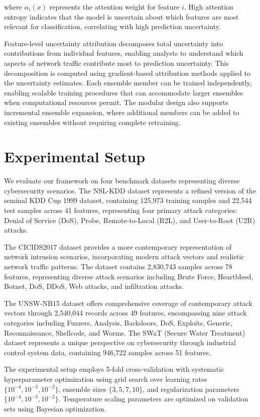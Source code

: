 \documentclass[journal]{IEEEtran}
\begin{document}
where $\alpha_i(x)$ represents the attention weight for feature $i$. High attention entropy indicates that the model is uncertain about which features are most relevant for classification, correlating with high prediction uncertainty.

Feature-level uncertainty attribution decomposes total uncertainty into contributions from individual features, enabling analysts to understand which aspects of network traffic contribute most to prediction uncertainty. This decomposition is computed using gradient-based attribution methods applied to the uncertainty estimates. Each ensemble member can be trained independently, enabling scalable training procedures that can accommodate larger ensembles when computational resources permit. The modular design also supports incremental ensemble expansion, where additional members can be added to existing ensembles without requiring complete retraining.

\section{Experimental Setup}

We evaluate our framework on four benchmark datasets representing diverse cybersecurity scenarios. The NSL-KDD dataset represents a refined version of the seminal KDD Cup 1999 dataset, containing 125,973 training samples and 22,544 test samples across 41 features, representing four primary attack categories: Denial of Service (DoS), Probe, Remote-to-Local (R2L), and User-to-Root (U2R) attacks.

The CICIDS2017 dataset provides a more contemporary representation of network intrusion scenarios, incorporating modern attack vectors and realistic network traffic patterns. The dataset contains 2,830,743 samples across 78 features, representing diverse attack scenarios including Brute Force, Heartbleed, Botnet, DoS, DDoS, Web attacks, and infiltration attacks.

The UNSW-NB15 dataset offers comprehensive coverage of contemporary attack vectors through 2,540,044 records across 49 features, encompassing nine attack categories including Fuzzers, Analysis, Backdoors, DoS, Exploits, Generic, Reconnaissance, Shellcode, and Worms. The SWaT (Secure Water Treatment) dataset represents a unique perspective on cybersecurity through industrial control system data, containing 946,722 samples across 51 features.

The experimental setup employs 5-fold cross-validation with systematic hyperparameter optimization using grid search over learning rates $\{10^{-4}, 10^{-3}, 10^{-2}\}$, ensemble sizes $\{3, 5, 7, 10\}$, and regularization parameters $\{10^{-4}, 10^{-3}, 10^{-2}\}$. Temperature scaling parameters are optimized on validation sets using Bayesian optimization.
\end{document}
